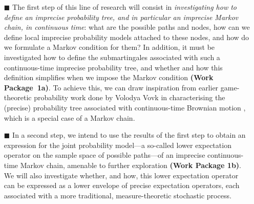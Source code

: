 \documentclass[11pt,dvipsnames,usenames,a4paper]{article}
\begin{document}
\vspace{6pt}
\begin{itemize}
\item[\tiny$\blacksquare$]
The first step of this line of research will consist in \emph{investigating how to define an imprecise probability tree, and in particular an imprecise Markov chain, in continuous time}: what are the possible paths and nodes, how can we define local imprecise probability models attached to these nodes, and how do we formulate a Markov condition for them?
In addition, it must be investigated how to define the submartingales associated with such a continuous-time imprecise probability tree, and whether and how this definition simplifies when we impose the Markov condition {\bf(Work Package~1a)}.
To achieve this, we can draw inspiration from earlier game-theoretic probability work done by Volodya Vovk in characterising the (precise) probability tree associated with continuous-time Brownian motion \cite{vovk2008:brownian,vovk2012:emergence:of:probability}, which is a special case of a Markov chain.%

\item[\tiny$\blacksquare$]
In a second step, we intend to use the results of the first step to obtain an expression for the joint probability model---a so-called lower expectation operator on the sample space of possible paths---of an imprecise continuous-time Markov chain, amenable to further exploration {\bf(Work Package 1b)}.
We will also investigate whether, and how, this lower expectation operator can be expressed as a lower envelope of precise expectation operators, each associated with a more traditional, measure-theoretic stochastic process.


\end{itemize}
\end{document}
